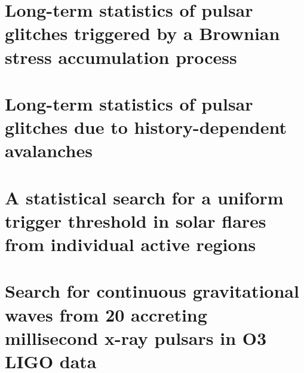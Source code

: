 \documentclass[School=Unimelb]{Dissertate}
\begin{document}
  \graphicspath{{./figures/}}
  
  \frontmatter

  \linenumbers

  \chapter{Long-term statistics of pulsar glitches triggered by a Brownian stress accumulation process}
  \label{chap:bsa}
  
  
  \chapter{Long-term statistics of pulsar glitches due to history-dependent avalanches}
  \label{chap:hda}
  

  \chapter{A statistical search for a uniform trigger threshold in solar flares from individual active regions}
  \label{chap:sf}
  


  \chapter{Search for continuous gravitational waves from 20 accreting millisecond x-ray pulsars in O3 LIGO data}
  \label{chap:amxp}
  

  \clearpage
  \printbibliography
\end{document}
